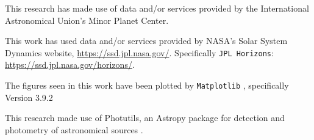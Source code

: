 \documentclass{UCreport}
\begin{document}
This research has made use of data and/or services provided by the International Astronomical Union's Minor Planet Center.

This work has used data and/or services provided by NASA's Solar System Dynamics website, \url{https://ssd.jpl.nasa.gov/}. Specifically \texttt{JPL Horizons}: \url{https://ssd.jpl.nasa.gov/horizons/}.

The figures seen in this work have been plotted by \texttt{Matplotlib} \citep{Hunter2007}, specifically Version 3.9.2 \citep{PLT3.9.2}

This research made use of Photutils, an Astropy package for detection and photometry of astronomical sources \citep{Bradley2024}.

% 

\end{document}
